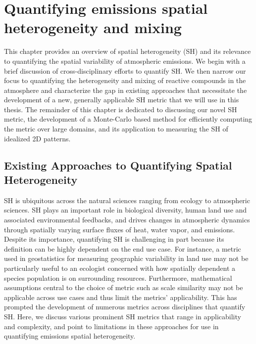 \chapter{Quantifying emissions spatial heterogeneity and mixing}

This chapter provides an overview of spatial heterogeneity (SH) and its relevance to quantifying the spatial variability of atmospheric emissions. We begin with a brief discussion of cross-disciplinary efforts to quantify SH. We then narrow our focus to quantifying the heterogeneity and mixing of reactive compounds in the atmosphere and characterize the gap in existing approaches that necessitate the development of a new, generally applicable SH metric that we will use in this thesis. The remainder of this chapter is dedicated to discussing our novel SH metric, the development of a Monte-Carlo based method for efficiently computing the metric over large domains, and its application to measuring the SH of idealized 2D patterns.  

\section{Existing Approaches to Quantifying Spatial Heterogeneity}\label{existing-sh-metrics}
SH is ubiquitous across the natural sciences ranging from ecology to atmospheric sciences. SH plays an important role in biological diversity, human land use and associated environmental feedbacks, and drives changes in atmospheric dynamics through spatially varying surface fluxes of heat, water vapor, and emissions. Despite its importance, quantifying SH is challenging in part because its definition can be highly dependent on the end use case. For instance, a metric used in geostatistics for measuring geographic variability in land use may not be particularly useful to an ecologist concerned with how spatially dependent a species population is on surrounding resources. Furthermore, mathematical assumptions central to the choice of metric such as scale similarity may not be applicable across use cases and thus limit the metrics' applicability. This has prompted the development of numerous metrics across disciplines that quantify SH. Here, we discuss various prominent SH metrics that range in applicability and complexity, and point to limitations in these approaches for use in quantifying emissions spatial heterogeneity. 

